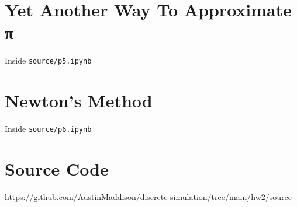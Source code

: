 \documentclass{article}
\begin{document}
\section{Yet Another Way To Approximate π}
Inside \texttt{source/p5.ipynb}

\section{Newton’s Method}
Inside \texttt{source/p6.ipynb}

\section*{Source Code}
\href{https://github.com/AustinMaddison/discrete-simulation/tree/main/hw2/source}{https://github.com/AustinMaddison/discrete-simulation/tree/main/hw2/source}

%
%
\end{document}
